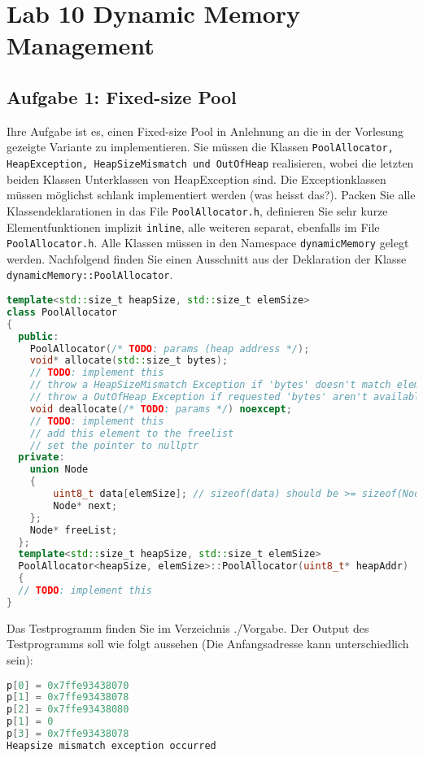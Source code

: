 \section{Lab 10 Dynamic Memory Management}
\subsection{Aufgabe 1: Fixed-size Pool}
Ihre Aufgabe ist es, einen Fixed-size Pool in Anlehnung an die in der Vorlesung gezeigte Variante zu implementieren. Sie müssen die Klassen \texttt{PoolAllocator, HeapException, HeapSizeMismatch und OutOfHeap} realisieren, wobei die letzten beiden Klassen Unterklassen von HeapException sind. Die Exceptionklassen müssen möglichst schlank implementiert werden (was heisst das?).
Packen Sie alle Klassendeklarationen in das File \texttt{PoolAllocator.h}, definieren Sie sehr kurze Elementfunktionen implizit \texttt{inline}, alle weiteren separat, ebenfalls im File \texttt{PoolAllocator.h}. Alle Klassen müssen in den Namespace \texttt{dynamicMemory} gelegt werden. Nachfolgend finden Sie einen Ausschnitt aus der Deklaration der Klasse \texttt{dynamicMemory::PoolAllocator}.

\begin{lstlisting}[language=C++, style=C++]
template<std::size_t heapSize, std::size_t elemSize>
class PoolAllocator
{
  public:
    PoolAllocator(/* TODO: params (heap address */);
    void* allocate(std::size_t bytes);
    // TODO: implement this
    // throw a HeapSizeMismatch Exception if 'bytes' doesn't match elemSize
    // throw a OutOfHeap Exception if requested 'bytes' aren't available
    void deallocate(/* TODO: params */) noexcept;
    // TODO: implement this
    // add this element to the freelist
    // set the pointer to nullptr
  private:
    union Node
    {
        uint8_t data[elemSize]; // sizeof(data) should be >= sizeof(Node*)
        Node* next;
    };
    Node* freeList;
  };
  template<std::size_t heapSize, std::size_t elemSize>
  PoolAllocator<heapSize, elemSize>::PoolAllocator(uint8_t* heapAddr)
  {
  // TODO: implement this
}
\end{lstlisting}

Das Testprogramm finden Sie im Verzeichnis ./Vorgabe. Der Output des Testprogramms soll wie folgt aussehen (Die Anfangsadresse kann unterschiedlich sein):

\begin{lstlisting}[language=C++, style=C++]
p[0] = 0x7ffe93438070
p[1] = 0x7ffe93438078
p[2] = 0x7ffe93438080
p[1] = 0
p[3] = 0x7ffe93438078
Heapsize mismatch exception occurred
\end{lstlisting}

